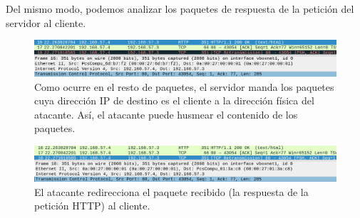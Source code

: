 \documentclass[11pt]{article}
\begin{document}
Del mismo modo, podemos analizar los paquetes de respuesta de la petición del servidor al cliente.

\begin{figure}[H]
	\centering
	\includegraphics[width=160mm]{images/atack1/response-server-atacker}
	\caption{Como ocurre en el resto de paquetes, el servidor manda los paquetes cuya dirección IP de destino es el cliente a la dirección física del atacante. Así, el atacante puede husmear el contenido de los paquetes.}
	\label{fig:response-server-atacker}
\end{figure}

\begin{figure}[H]
	\centering
	\includegraphics[width=160mm]{images/atack1/response-atacker-client}
	\caption{El atacante redirecciona el paquete recibido (la respuesta de la petición HTTP) al cliente.}
	\label{fig:response-atacker-client}
\end{figure}
\end{document}
